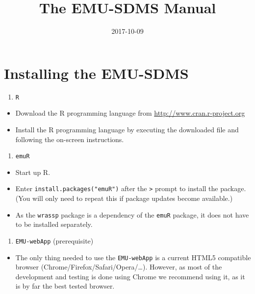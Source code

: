 \documentclass[]{book}
\title{The EMU-SDMS Manual}
\author{}
\date{2017-10-09}
\providecommand{\tightlist}{%
  \setlength{\itemsep}{0pt}\setlength{\parskip}{0pt}}
\theoremstyle{definition}
\theoremstyle{definition}
\theoremstyle{definition}
\theoremstyle{remark}
\begin{document}
\maketitle

{
\setcounter{tocdepth}{1}
\tableofcontents
}
\chapter{Installing the EMU-SDMS}\label{installing-the-emu-sdms}

\begin{enumerate}
\def\labelenumi{\arabic{enumi}.}
\tightlist
\item
  \texttt{R}
\end{enumerate}

\begin{itemize}
\tightlist
\item
  Download the R programming language from
  \href{www.cran.r-project.org}{http://www.cran.r-project.org}
\item
  Install the R programming language by executing the downloaded file
  and following the on-screen instructions.
\end{itemize}

\begin{enumerate}
\def\labelenumi{\arabic{enumi}.}
\setcounter{enumi}{1}
\tightlist
\item
  \texttt{emuR}
\end{enumerate}

\begin{itemize}
\tightlist
\item
  Start up R.
\item
  Enter \texttt{install.packages("emuR")} after the
  \texttt{\textgreater{}} prompt to install the package. (You will only
  need to repeat this if package updates become available.)
\item
  As the \texttt{wrassp} package is a dependency of the \texttt{emuR}
  package, it does not have to be installed separately.
\end{itemize}

\begin{enumerate}
\def\labelenumi{\arabic{enumi}.}
\setcounter{enumi}{2}
\tightlist
\item
  \texttt{EMU-webApp} (prerequisite)
\end{enumerate}

\begin{itemize}
\tightlist
\item
  The only thing needed to use the \texttt{EMU-webApp} is a current
  HTML5 compatible browser (Chrome/Firefox/Safari/Opera/\ldots{}).
  However, as most of the development and testing is done using Chrome
  we recommend using it, as it is by far the best tested browser.
\end{itemize}
\end{document}
